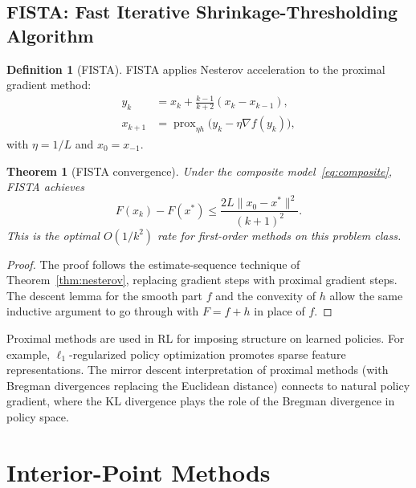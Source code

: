 \documentclass[11pt,a4paper]{article}
\theoremstyle{definition}
\newtheorem{definition}{Definition}[section]
\theoremstyle{plain}
\newtheorem{theorem}{Theorem}[section]
\theoremstyle{remark}
\DeclareMathOperator{\prox}{prox}
\begin{document}
\subsection{FISTA: Fast Iterative Shrinkage-Thresholding Algorithm}

\begin{definition}[FISTA]\label{def:fista}
FISTA applies Nesterov acceleration to the proximal gradient method:
\begin{equation}\label{eq:fista}
\begin{aligned}
  y_k &= x_k + \frac{k-1}{k+2}(x_k - x_{k-1}), \\
  x_{k+1} &= \prox_{\eta h}\bigl(y_k - \eta \nabla f(y_k)\bigr),
\end{aligned}
\end{equation}
with $\eta = 1/L$ and $x_0 = x_{-1}$.
\end{definition}

\begin{theorem}[FISTA convergence]\label{thm:fista}
Under the composite model~\eqref{eq:composite}, FISTA achieves
\[
  F(x_k) - F(x^*) \le \frac{2L\|x_0 - x^*\|^2}{(k+1)^2}.
\]
This is the optimal $O(1/k^2)$ rate for first-order methods on this problem
class.
\end{theorem}

\begin{proof}
The proof follows the estimate-sequence technique of Theorem~\ref{thm:nesterov},
replacing gradient steps with proximal gradient steps. The descent lemma for the
smooth part $f$ and the convexity of $h$ allow the same inductive argument to
go through with $F = f + h$ in place of $f$.
\end{proof}

\begin{rlconnection}
Proximal methods are used in RL for imposing structure on learned policies.
For example, $\ell_1$-regularized policy optimization promotes sparse feature
representations. The mirror descent interpretation of proximal methods (with
Bregman divergences replacing the Euclidean distance) connects to natural
policy gradient, where the KL divergence plays the role of the Bregman
divergence in policy space.
\end{rlconnection}

\section{Interior-Point Methods}\label{sec:interior}
\end{document}
